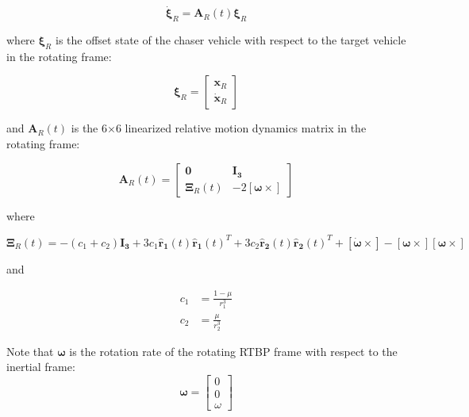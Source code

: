 \documentclass[a4paper]{article}
\begin{document}
\begin{equation} \label{eq:RelmoDerivs}
\dot{\boldsymbol{\xi}}_R = \mathbf{A}_R(t)\boldsymbol{\xi}_R
\end{equation}

where \(\boldsymbol{\xi}_R\) is the offset state of the chaser vehicle with respect to the target vehicle in the rotating frame: %

\begin{equation*}
\boldsymbol{\xi}_R = \begin{bmatrix}
									\mathbf{x}_R \\
									\dot{\mathbf{x}}_R
									\end{bmatrix}
\end{equation*}

and  \(\mathbf{A}_R(t)\) is the 6\(\times\)6 linearized relative motion dynamics matrix in the rotating frame: %

\begin{equation} \label{eq:RelmoDynMatrix}
\mathbf{A}_R(t) = \begin{bmatrix}
								\mathbf{0}          & \mathbf{I_3} \\
								\mathbf{\Xi}_R(t) & -2 [\boldsymbol{\omega} \times]
								\end{bmatrix}
\end{equation}

where

\begin{equation*}
\mathbf{\Xi}_R(t) = -(c_1 + c_2)\mathbf{I_3} 
								+ 3c_1\mathbf{\hat{r}_1}(t) \mathbf{\hat{r}_1}(t)^T 
								+ 3c_2\mathbf{\hat{r}_2}(t) \mathbf{\hat{r}_2}(t)^T 
								+ [\boldsymbol{\dot{\omega}} \times] 
								- [\boldsymbol{\omega}\times][\boldsymbol{\omega}\times]
\end{equation*}

and

\begin{equation*}
\begin{aligned}
c_1 &= \frac{1- \mu}{r_1^3} \\
c_2 &= \frac{\mu}{r_2^3}
\end{aligned}
\end{equation*}

Note that \(\boldsymbol{\omega}\) is the rotation rate of the rotating RTBP frame with respect to the inertial frame:
\begin{equation*}
\boldsymbol{\omega} = \begin{bmatrix}
					0 \\ 
					0 \\
					\omega
					\end{bmatrix}
\end{equation*}
\end{document}
